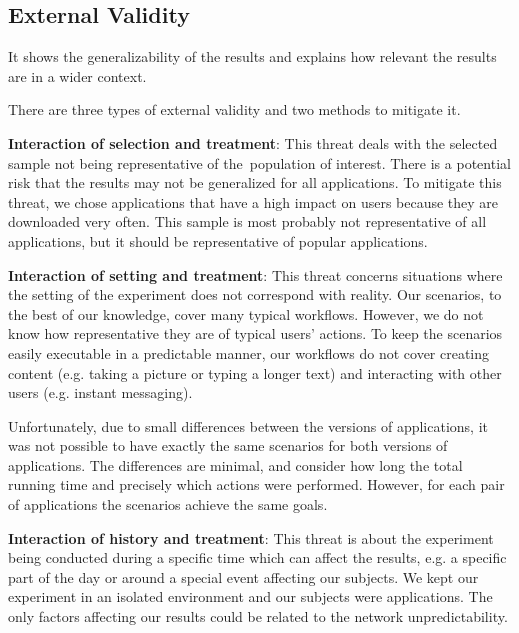 
\subsection{External Validity}
It shows the generalizability of the results and explains how relevant the results are in a wider context. 

There are three types of external validity and two methods to mitigate it.

\textbf{Interaction of selection and treatment}: This threat deals with the selected sample not being representative of the~population of interest. There is a potential risk that the results may not be generalized for all applications. To mitigate this threat, we chose applications that have a high impact on users because they are downloaded very often. This sample is most probably not representative of all applications, but it should be representative of popular applications.

\textbf{Interaction of setting and treatment}: This threat concerns situations where the setting of the experiment does not correspond with reality. Our scenarios, to the best of our knowledge, cover many typical workflows. However, we do not know how representative they are of typical users' actions. To keep the scenarios easily executable in a predictable manner, our workflows do not cover creating content (e.g. taking a picture or typing a longer text) and interacting with other users (e.g. instant messaging).

Unfortunately, due to small differences between the versions of applications, it was not possible to have exactly the same scenarios for both versions of applications. The differences are minimal, and consider how long the total running time and precisely which actions were performed. However, for each pair of applications the scenarios achieve the same goals.

\textbf{Interaction of history and treatment}: This threat is about the experiment being conducted during a specific time which can affect the results, e.g. a specific part of the day or around a special event affecting our subjects. We kept our experiment in an isolated environment and our subjects were applications. The only factors affecting our results could be related to the network unpredictability.


